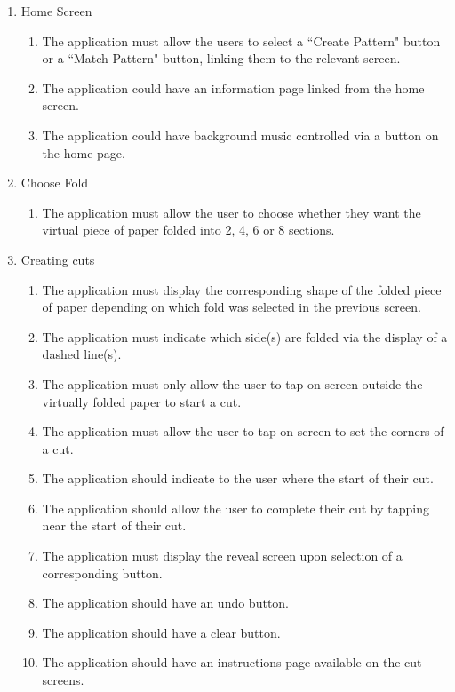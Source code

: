 \documentclass[11pt]{article}
\begin{document}
    \begin{enumerate}
      \item Home Screen
        \begin{enumerate}[label*=\arabic*.]
        \item The application must allow the users to select a ``Create Pattern" button or a ``Match Pattern" button, linking them to the relevant screen.
        \item The application could have an information page linked from the home screen.
        \item The application could have background music controlled via a button on the home page.
      \end{enumerate}
      
       \item Choose Fold
        \begin{enumerate}[label*=\arabic*.]
        \item The application must allow the user to choose whether they want the virtual piece of paper folded into 2, 4, 6 or 8 sections.
      \end{enumerate}
      
      \item Creating cuts
      \begin{enumerate}[label*=\arabic*.]
        \item The application must display the corresponding shape of the folded piece of paper depending on which fold was selected in the previous screen.
        \item The application must indicate which side(s) are folded via the display of a dashed line(s).
        \item The application must only allow the user to tap on screen outside the virtually folded paper to start a cut. 
        \item The application must allow the user to tap on screen to set the corners of a cut.
        \item The application should indicate to the user where the start of their cut.
        \item The application should allow the user to complete their cut by tapping near the start of their cut. 
        \item The application must display the reveal screen upon selection of a corresponding button.  
         \item The application should have an undo button.
          \item The application should have a clear button.
        \item The application should have an instructions page available on the cut screens. 
      \end{enumerate}
      

\end{enumerate}
\end{document}
